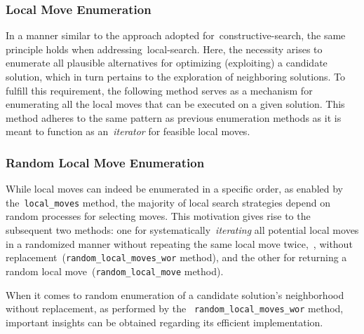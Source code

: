 \subsubsection*{Local Move Enumeration}

In a manner similar to the approach adopted for~\acrshort{constructive-search},
the same principle holds when addressing~\acrshort{local-search}. Here, the
necessity arises to enumerate all plausible alternatives for optimizing
(exploiting) a candidate solution, which in turn pertains to the exploration of
neighboring solutions. To fulfill this requirement, the following method serves
as a mechanism for enumerating all the local moves that can be executed on a
given solution. This method adheres to the same pattern as previous enumeration
methods as it is meant to function as an~\emph{iterator} for feasible local
moves.

\begin{center}
\end{center}

\subsubsection*{Random Local Move Enumeration}

While local moves can indeed be enumerated in a specific order, as enabled by
the~\texttt{local\_moves} method, the majority of local search strategies depend on random
processes for selecting moves. This motivation gives rise to the subsequent two
methods: one for systematically~\emph{iterating} all potential local moves in a
randomized manner without repeating the same local move twice,~\ie{}, without
replacement~(\texttt{random\_local\_moves\_wor} method), and the other for returning a random local
move~(\texttt{random\_local\_move} method).

\begin{center}

\end{center}

When it comes to random enumeration of a candidate solution's neighborhood
without replacement, as performed by the ~\texttt{random\_local\_moves\_wor} method,
important insights can be obtained regarding its efficient implementation.

